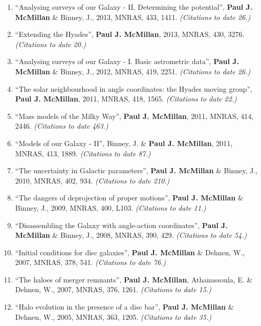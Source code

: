 \documentclass{resume}
\begin{document}
\begin{enumerate}
\item ``Analysing surveys of our Galaxy - II. Determining the potential'', \textbf{Paul J. McMillan} \& Binney, J., 2013, MNRAS, 433, 1411. \textit{(Citations to date 26.)}

\item ``Extending the Hyades'', \textbf{Paul J. McMillan}, 2013, MNRAS, 430, 3276. \textit{(Citations to date 20.)}

\item ``Analysing surveys of our Galaxy - I. Basic astrometric data'', \textbf{Paul J. McMillan} \& Binney, J., 2012, MNRAS, 419, 2251. \textit{(Citations to date 26.)}

\item ``The solar neighbourhood in angle coordinates: the Hyades moving group'', \textbf{Paul J. McMillan}, 2011, MNRAS, 418, 1565. \textit{(Citations to date 22.)}

\item ``Mass models of the Milky Way'', \textbf{Paul J. McMillan}, 2011, MNRAS, 414, 2446. \textit{(Citations to date 463.)}

\item ``Models of our Galaxy - II'', Binney, J. \& \textbf{Paul J. McMillan}, 2011, MNRAS, 413, 1889. \textit{(Citations to date 87.)}

\item ``The uncertainty in Galactic parameters'', \textbf{Paul J. McMillan} \& Binney, J., 2010, MNRAS, 402, 934. \textit{(Citations to date 210.)}

\item ``The dangers of deprojection of proper motions'', \textbf{Paul J. McMillan} \& Binney, J., 2009, MNRAS, 400, L103. \textit{(Citations to date 11.)}

\item ``Disassembling the Galaxy with angle-action coordinates'', \textbf{Paul J. McMillan} \& Binney, J., 2008, MNRAS, 390, 429. \textit{(Citations to date 54.)}

\item ``Initial conditions for disc galaxies'', \textbf{Paul J. McMillan} \& Dehnen, W., 2007, MNRAS, 378, 541. \textit{(Citations to date 76.)}

\item ``The haloes of merger remnants'', \textbf{Paul J. McMillan}, Athanassoula, E. \& Dehnen, W., 2007, MNRAS, 376, 1261. \textit{(Citations to date 15.)}

\item ``Halo evolution in the presence of a disc bar'', \textbf{Paul J. McMillan} \& Dehnen, W., 2005, MNRAS, 363, 1205. \textit{(Citations to date 35.)}

\end{enumerate}
\end{document}

